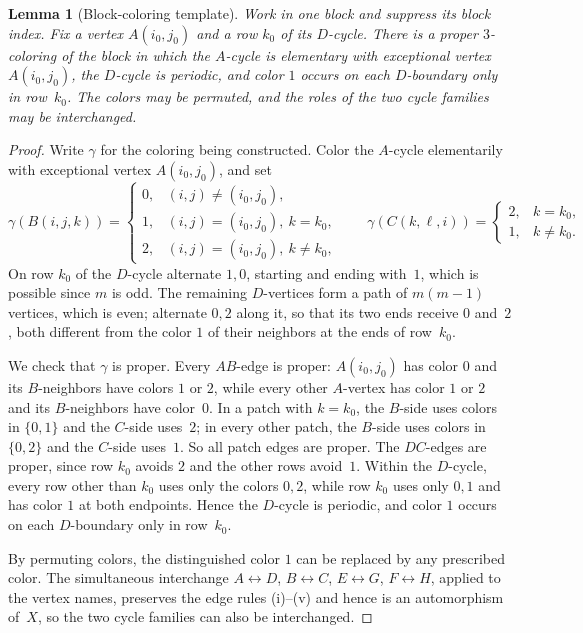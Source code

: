 \documentclass[11pt,letterpaper]{article}
\numberwithin{equation}{section}
\theoremstyle{plain}
\newtheorem{lemma}[theorem]{Lemma}
\theoremstyle{definition}
\theoremstyle{remark}
\begin{document}
\begin{lemma}[Block-coloring template]\label{lem:template}
Work in one block and suppress its block index. Fix a vertex $A(i_0,j_0)$ and a row $k_0$ of its $D$-cycle. There is a proper $3$-coloring of the block in which the $A$-cycle is elementary with exceptional vertex $A(i_0,j_0)$, the $D$-cycle is periodic, and color $1$ occurs on each $D$-boundary only in row~$k_0$. The colors may be permuted, and the roles of the two cycle families may be interchanged.
\end{lemma}

\begin{proof}
Write $\gamma$ for the coloring being constructed. Color the $A$-cycle elementarily with exceptional vertex $A(i_0,j_0)$, and set
\begin{equation*}
  \gamma(B(i,j,k))=
  \begin{cases}
    0, & (i,j)\ne(i_0,j_0),\\
    1, & (i,j)=(i_0,j_0),\ k=k_0,\\
    2, & (i,j)=(i_0,j_0),\ k\ne k_0,
  \end{cases}
  \qquad
  \gamma(C(k,\ell,i))=
  \begin{cases}
    2, & k=k_0,\\
    1, & k\ne k_0.
  \end{cases}
\end{equation*}
On row $k_0$ of the $D$-cycle alternate $1,0$, starting and ending with~$1$, which is possible since $m$ is odd. The remaining $D$-vertices form a path of $m(m-1)$ vertices, which is even; alternate $0,2$ along it, so that its two ends receive $0$ and~$2$, both different from the color $1$ of their neighbors at the ends of row~$k_0$.

We check that $\gamma$ is proper. Every $AB$-edge is proper: $A(i_0,j_0)$ has color $0$ and its $B$-neighbors have colors $1$ or $2$, while every other $A$-vertex has color $1$ or $2$ and its $B$-neighbors have color~$0$. In a patch with $k=k_0$, the $B$-side uses colors in $\{0,1\}$ and the $C$-side uses~$2$; in every other patch, the $B$-side uses colors in $\{0,2\}$ and the $C$-side uses~$1$. So all patch edges are proper. The $DC$-edges are proper, since row $k_0$ avoids $2$ and the other rows avoid~$1$. Within the $D$-cycle, every row other than $k_0$ uses only the colors $0,2$, while row $k_0$ uses only $0,1$ and has color $1$ at both endpoints. Hence the $D$-cycle is periodic, and color $1$ occurs on each $D$-boundary only in row~$k_0$.

By permuting colors, the distinguished color $1$ can be replaced by any prescribed color. The simultaneous interchange $A\leftrightarrow D$, $B\leftrightarrow C$, $E\leftrightarrow G$, $F\leftrightarrow H$, applied to the vertex names, preserves the edge rules (i)--(v) and hence is an automorphism of~$X$, so the two cycle families can also be interchanged.
\end{proof}
\end{document}
